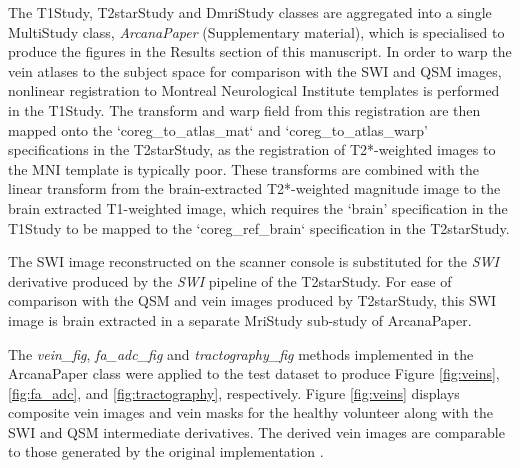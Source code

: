 \documentclass[smallextended]{svjour3}       %
\begin{document}
The T1Study, T2starStudy and DmriStudy classes are
aggregated into a single MultiStudy class,
\emph{ArcanaPaper} (Supplementary material), which is specialised to produce
the figures in the Results section of this manuscript. In order to warp the
vein atlases to the subject space for comparison with the SWI and QSM images,
nonlinear registration to Montreal Neurological Institute templates
\citep{grabner_symmetric_2006} is performed in the T1Study. The transform and warp
field from this registration are then mapped onto the `coreg\_to\_atlas\_mat` and
`coreg\_to\_atlas\_warp' specifications in the T2starStudy, as the registration of
T2*-weighted images to the MNI template is typically poor.
These transforms are combined with the linear transform from the
brain-extracted T2*-weighted magnitude image to the brain extracted T1-weighted image,
which requires the `brain' specification in the T1Study to be mapped
to the `coreg\_ref\_brain` specification in the T2starStudy.

The SWI image reconstructed on the scanner console is substituted for the \emph{SWI} derivative
produced by the \emph{SWI} pipeline of the T2starStudy. For ease of comparison
with the QSM and vein images produced by T2starStudy, this SWI image is brain extracted
in a separate MriStudy sub-study of ArcanaPaper.

The \emph{vein\_fig}, \emph{fa\_adc\_fig} and \emph{tractography\_fig} methods
implemented in the ArcanaPaper class were applied to the test dataset to produce
Figure \ref{fig:veins}, \ref{fig:fa_adc}, and \ref{fig:tractography}, respectively.
Figure \ref{fig:veins} displays composite vein images and vein masks for the healthy
volunteer along with the SWI and QSM intermediate derivatives.
The derived vein images are comparable to those
generated by the original implementation \citep{ward_combining_2018}.
\end{document}
